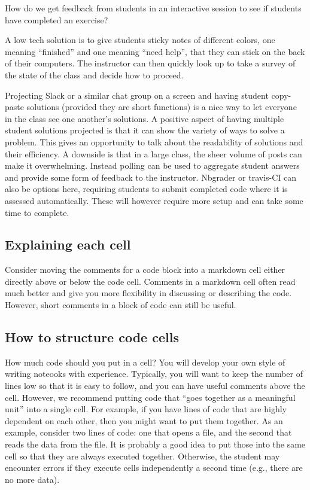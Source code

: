 \documentclass[]{book}
\begin{document}
How do we get feedback from students in an interactive session to see
if students have completed an exercise?

A low tech solution is to give students sticky notes of different
colors, one meaning ``finished'' and one meaning ``need help'', that they
can stick on the back of their computers. The instructor can then
quickly look up to take a survey of the state of the class and decide
how to proceed.

Projecting Slack or a similar chat group on a screen and having
student copy-paste solutions (provided they are short functions) is a
nice way to let everyone in the class see one another's solutions. A
positive aspect of having multiple student solutions projected is that
it can show the variety of ways to solve a problem. This gives an
opportunity to talk about the readability of solutions and their
efficiency. A downside is that in a large class, the sheer volume of
posts can make it overwhelming. Instead polling can be used to
aggregate student answers and provide some form of feedback to the
instructor. Nbgrader or travis-CI can also be options here, requiring
students to submit completed code where it is assessed
automatically. These will however require more setup and can take some
time to complete.

\hypertarget{explaining-each-cell}{%
\subsection{Explaining each cell}\label{explaining-each-cell}}

Consider moving the comments for a code block into a markdown cell
either directly above or below the code cell. Comments in a markdown
cell often read much better and give you more flexibility in
discussing or describing the code. However, short comments in a block
of code can still be useful.

\hypertarget{how-to-structure-code-cells}{%
\subsection{How to structure code cells}\label{how-to-structure-code-cells}}

How much code should you put in a cell? You will develop your own
style of writing noteooks with experience. Typically, you will want to
keep the number of lines low so that it is easy to follow, and you can
have useful comments above the cell. However, we recommend putting
code that ``goes together as a meaningful unit'' into a single cell. For
example, if you have lines of code that are highly dependent on each
other, then you might want to put them together. As an example,
consider two lines of code: one that opens a file, and the second that
reads the data from the file. It is probably a good idea to put those
into the same cell so that they are always executed
together. Otherwise, the student may encounter errors if they execute
cells independently a second time (e.g., there are no more data).
\end{document}
